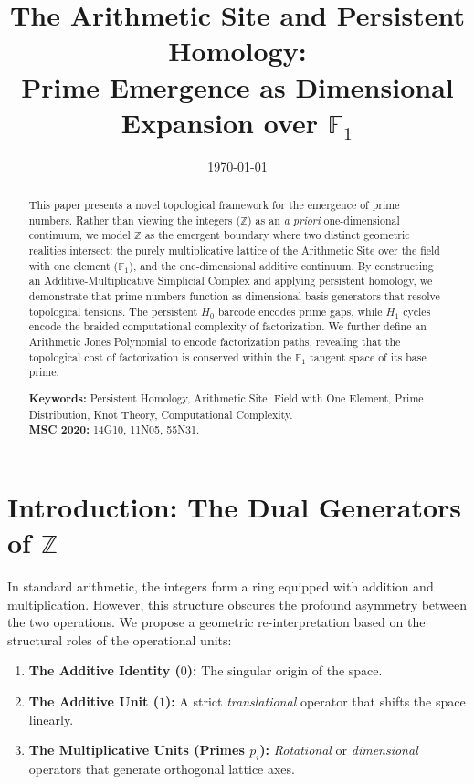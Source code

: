 \documentclass[11pt, a4paper]{article}
\title{The Arithmetic Site and Persistent Homology: \\ Prime Emergence as Dimensional Expansion over $\mathbb{F}_1$}
\author{} %
\date{\today}
\begin{document}
\maketitle

\begin{abstract}
This paper presents a novel topological framework for the emergence of prime numbers. Rather than viewing the integers ($\mathbb{Z}$) as an \textit{a priori} one-dimensional continuum, we model $\mathbb{Z}$ as the emergent boundary where two distinct geometric realities intersect: the purely multiplicative lattice of the Arithmetic Site over the field with one element ($\mathbb{F}_1$), and the one-dimensional additive continuum. By constructing an Additive-Multiplicative Simplicial Complex and applying persistent homology, we demonstrate that prime numbers function as dimensional basis generators that resolve topological tensions. The persistent $H_0$ barcode encodes prime gaps, while $H_1$ cycles encode the braided computational complexity of factorization. We further define an Arithmetic Jones Polynomial to encode factorization paths, revealing that the topological cost of factorization is conserved within the $\mathbb{F}_1$ tangent space of its base prime.

\vspace{0.5cm}
\noindent \textbf{Keywords:} Persistent Homology, Arithmetic Site, Field with One Element, Prime Distribution, Knot Theory, Computational Complexity. \\
\noindent \textbf{MSC 2020:} 14G10, 11N05, 55N31.
\end{abstract}

\section{Introduction: The Dual Generators of $\mathbb{Z}$}

In standard arithmetic, the integers form a ring equipped with addition and multiplication. However, this structure obscures the profound asymmetry between the two operations. We propose a geometric re-interpretation based on the structural roles of the operational units:

\begin{enumerate}
    \item \textbf{The Additive Identity ($0$):} The singular origin of the space.
    \item \textbf{The Additive Unit ($1$):} A strict \textit{translational} operator that shifts the space linearly.
    \item \textbf{The Multiplicative Units (Primes $p_i$):} \textit{Rotational} or \textit{dimensional} operators that generate orthogonal lattice axes.
\end{enumerate}
\end{document}
